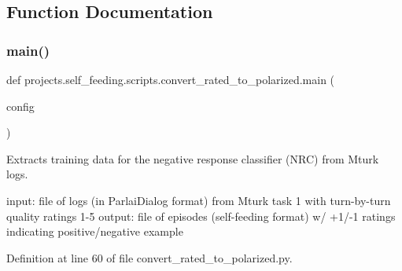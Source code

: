 \subsection{Function Documentation}
\mbox{\label{namespaceprojects_1_1self__feeding_1_1scripts_1_1convert__rated__to__polarized_abb1b1c7522da8d4703fc74cdb6422d87}} 
\subsubsection{\texorpdfstring{main()}{main()}}
{\footnotesize\ttfamily def projects.\+self\+\_\+feeding.\+scripts.\+convert\+\_\+rated\+\_\+to\+\_\+polarized.\+main (\begin{DoxyParamCaption}\item[{}]{config }\end{DoxyParamCaption})}

\begin{DoxyVerb}Extracts training data for the negative response classifier (NRC) from Mturk logs.

input: file of logs (in ParlaiDialog format) from Mturk task 1 with turn-by-turn
    quality ratings 1-5
output: file of episodes (self-feeding format) w/ +1/-1 ratings indicating
    positive/negative example
\end{DoxyVerb}
 

Definition at line 60 of file convert\+\_\+rated\+\_\+to\+\_\+polarized.\+py.


